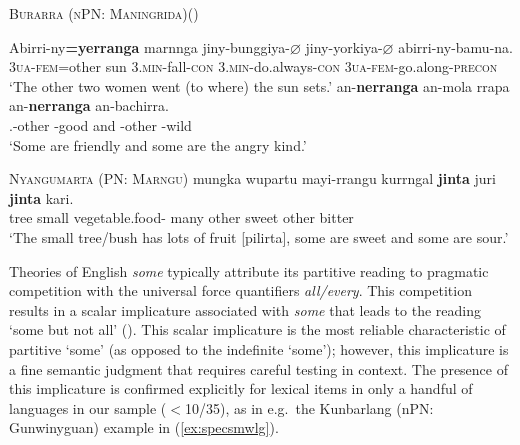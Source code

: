 \documentclass[12pt,egregdoesnotlikesansseriftitles]{scrartcl}
\begin{document}

\begin{exe}
  \ex\label{ex:smotherbur} \textsc{Burarra (nPN: Maningrida)}\hfill (\citealt{green87})
 \begin{xlist}
 \ex \gll Abirri-ny\textbf{=yerranga} marnnga jiny-bunggiya-$\varnothing$ jiny-yorkiya-$\varnothing$  abirri-ny-bamu-na. \\
 3\textsc{ua-fem}=other sun 3.\textsc{min}-fall-\textsc{con}
3.\textsc{min}-do.always-\textsc{con} 3\textsc{ua-fem}-go.along-\textsc{precon} \\
\glt `The other two women went (to where) the sun sets.' \label{ex:smotherbur2}
 \ex \gll an-\textbf{nerranga} an-mola  rrapa  an-\textbf{nerranga}  an-bachirra.\\
  \Third.\Min-other \Third\Min-good and \Third\Min-other \Third\Min-wild\\
  \glt `Some are friendly and some are the angry kind.' \label{ex:smotherbur3}
  \end{xlist}
  \ex\label{ex:smothernyan} \textsc{Nyangumarta (PN: Marngu)}\hfill {}
  \gll mungka wupartu mayi-rrangu kurrngal \textbf{jinta} juri \textbf{jinta} kari.\\
  tree  small vegetable.food-\Pl{} many other sweet other bitter\\
  \glt `The small tree/bush has lots of fruit [pilirta], some are sweet and some are sour.'
\end{exe}


Theories of English \textit{some} typically attribute its partitive reading to pragmatic competition with the universal force quantifiers \textit{all/every}. This competition results in a scalar implicature associated with \textit{some} that leads to the reading `some but not all' (\citealt{horn72}). This scalar implicature is the most reliable characteristic of partitive `some' (as opposed to the indefinite `some'); however, this implicature is a fine semantic judgment that requires careful testing in context. The presence of this implicature is confirmed explicitly  for lexical items in only a handful of languages in our sample ($<$10/35), as in e.g.\ the Kunbarlang (nPN: Gunwinyguan) example in (\ref{ex:specsmwlg}). %
\end{document}
